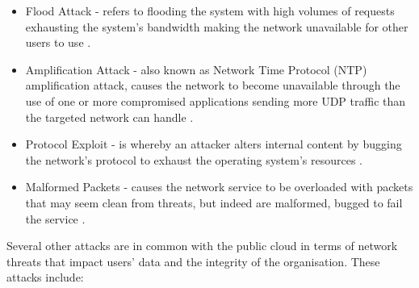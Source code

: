 \documentclass[12pt]{article}
\begin{document}
	\begin{itemize}
		\item Flood Attack - refers to flooding the system with high volumes of requests exhausting the system's bandwidth making the network unavailable for other users to use \cite{sonar_2014_survey}.
		\item Amplification Attack - also known as Network Time Protocol (NTP) amplification attack, causes the network to become unavailable through the use of one or more compromised applications sending more UDP traffic than the targeted network can handle \cite{sonar_2014_survey}. 
		\item Protocol Exploit - is whereby an attacker alters internal content by bugging the network's protocol to exhaust the operating system's resources \cite{sonar_2014_survey}.
		\item Malformed Packets - causes the network service to be overloaded with packets that may seem clean from threats, but indeed are malformed, bugged to fail the service \cite{alenezi_2012_methodologies}.
	\end{itemize}
	
	
	
	
	Several other attacks are in common with the public cloud in terms of network threats that impact users' data and the integrity of the organisation. These attacks include:
	\\
	
\end{document}
